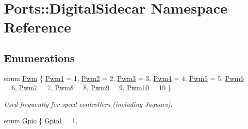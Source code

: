 \hypertarget{namespace_ports_1_1_digital_sidecar}{\section{\-Ports\-:\-:\-Digital\-Sidecar \-Namespace \-Reference}
\label{namespace_ports_1_1_digital_sidecar}
}
\subsection*{\-Enumerations}
\begin{DoxyCompactItemize}
\item 
enum \hyperlink{namespace_ports_1_1_digital_sidecar_a6310b3ee141fd167269e60cd822388b8}{\-Pwm} \{ \*
\hyperlink{namespace_ports_1_1_digital_sidecar_a6310b3ee141fd167269e60cd822388b8ad8e2cb2ea7068f405d0a3749b106ccbd}{\-Pwm1} =  1, 
\hyperlink{namespace_ports_1_1_digital_sidecar_a6310b3ee141fd167269e60cd822388b8a2382e65b4a351d69ac349275f02e4999}{\-Pwm2} =  2, 
\hyperlink{namespace_ports_1_1_digital_sidecar_a6310b3ee141fd167269e60cd822388b8a218e768cede7ee0482dfc18dfb3ca596}{\-Pwm3} =  3, 
\hyperlink{namespace_ports_1_1_digital_sidecar_a6310b3ee141fd167269e60cd822388b8a891de30829c5bf5730b0f95646975d77}{\-Pwm4} =  4, 
\*
\hyperlink{namespace_ports_1_1_digital_sidecar_a6310b3ee141fd167269e60cd822388b8a17fb36a750b2acaa63b37b01b54178b6}{\-Pwm5} =  5, 
\hyperlink{namespace_ports_1_1_digital_sidecar_a6310b3ee141fd167269e60cd822388b8a4dcb0720b650c1896e9f20c43dbdb83f}{\-Pwm6} =  6, 
\hyperlink{namespace_ports_1_1_digital_sidecar_a6310b3ee141fd167269e60cd822388b8ab4e646d2491d9a5203f14e511c351cae}{\-Pwm7} =  7, 
\hyperlink{namespace_ports_1_1_digital_sidecar_a6310b3ee141fd167269e60cd822388b8abd75519c7f140a776f57f2fbde2d0f45}{\-Pwm8} =  8, 
\*
\hyperlink{namespace_ports_1_1_digital_sidecar_a6310b3ee141fd167269e60cd822388b8a73bc4667700df43c6b6c48beaafc8a90}{\-Pwm9} =  9, 
\hyperlink{namespace_ports_1_1_digital_sidecar_a6310b3ee141fd167269e60cd822388b8ac519292778f31b330bf6d43ebe2957cd}{\-Pwm10} =  10
 \}
\begin{DoxyCompactList}\small\item\em \-Used frequently for speed-\/controllers (including \-Jaguars). \end{DoxyCompactList}\item 
enum \hyperlink{namespace_ports_1_1_digital_sidecar_a6c49b2f110f8b96c73858cfa03488c8c}{\-Gpio} \{ \*
\hyperlink{namespace_ports_1_1_digital_sidecar_a6c49b2f110f8b96c73858cfa03488c8ca22b9fad42960f6bac867388b94a74d39}{\-Gpio1} =  1, 

\end{DoxyCompactItemize}
